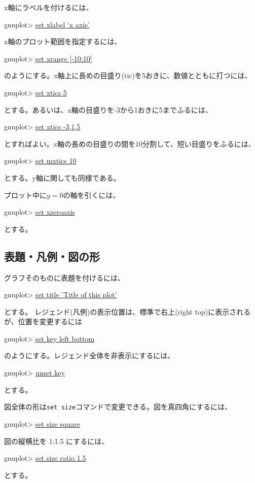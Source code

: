 {x軸にラベルを付けるには、
\begin{commandline2}
gnuplot> \underline{set xlabel 'x axis'}
\end{commandline2} \noindent
x軸のプロット範囲を指定するには、
\begin{commandline2}
gnuplot> \underline{set xrange [-10:10]}
\end{commandline2} \noindent
のようにする。x軸上に長めの目盛り(tic)を5おきに、数値とともに打つには、
\begin{commandline2}
gnuplot> \underline{set xtics 5}
\end{commandline2} \noindent
とする。あるいは、x軸の目盛りを-3から1おきに5までふるには、
\begin{commandline2}
gnuplot> \underline{set xtics -3,1,5}
\end{commandline2} \noindent
とすればよい。x軸の長めの目盛りの間を10分割して、短い目盛りをふるには、
\begin{commandline2}
gnuplot> \underline{set mxtics 10}
\end{commandline2} \noindent
とする。y軸に関しても同様である。

プロット中に$y=0$の軸を引くには、
\begin{commandline2}
gnuplot> \underline{set xzeroaxis}
\end{commandline2} \noindent
とする。

\subsection{表題・凡例・図の形}

グラフそのものに表題を付けるには、
\begin{commandline2}
gnuplot> \underline{set title 'Title of this plot'}
\end{commandline2} \noindent
とする。
レジェンド(凡例)の表示位置は、標準で右上(right top)に表示されるが、位置を変更するには
\begin{commandline2}
gnuplot> \underline{set key left bottom}
\end{commandline2} \noindent
のようにする。レジェンド全体を非表示にするには、
\begin{commandline2}
gnuplot> \underline{unset key}
\end{commandline2} \noindent
とする。

図全体の形は{\tt set size}コマンドで変更できる。図を真四角にするには、
\begin{commandline2}
gnuplot> \underline{set size square}
\end{commandline2} \noindent
図の縦横比を 1:1.5 にするには、
\begin{commandline2}
gnuplot> \underline{set size ratio 1.5}
\end{commandline2} \noindent
とする。

}

